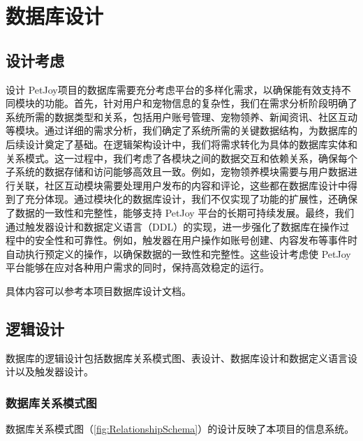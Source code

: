 \section{数据库设计}\label{sec:Database_Design}

\subsection{设计考虑}

设计 PetJoy项目的数据库需要充分考虑平台的多样化需求，以确保能有效支持不同模块的功能。首先，针对用户和宠物信息的复杂性，我们在需求分析阶段明确了系统所需的数据类型和关系，包括用户账号管理、宠物领养、新闻资讯、社区互动等模块。通过详细的需求分析，我们确定了系统所需的关键数据结构，为数据库的后续设计奠定了基础。在逻辑架构设计中，我们将需求转化为具体的数据库实体和关系模式。这一过程中，我们考虑了各模块之间的数据交互和依赖关系，确保每个子系统的数据存储和访问能够高效且一致。例如，宠物领养模块需要与用户数据进行关联，社区互动模块需要处理用户发布的内容和评论，这些都在数据库设计中得到了充分体现。通过模块化的数据库设计，我们不仅实现了功能的扩展性，还确保了数据的一致性和完整性，能够支持 PetJoy 平台的长期可持续发展。最终，我们通过触发器设计和数据定义语言（DDL）的实现，进一步强化了数据库在操作过程中的安全性和可靠性。例如，触发器在用户操作如账号创建、内容发布等事件时自动执行预定义的操作，以确保数据的一致性和完整性。这些设计考虑使 PetJoy 平台能够在应对各种用户需求的同时，保持高效稳定的运行。

具体内容可以参考本项目数据库设计文档。

\subsection{逻辑设计}

数据库的逻辑设计包括数据库关系模式图、表设计、数据库设计和数据定义语言设计以及触发器设计。

\subsubsection{数据库关系模式图}

数据库关系模式图（\cref{fig:RelationshipSchema}）的设计反映了本项目的信息系统。

